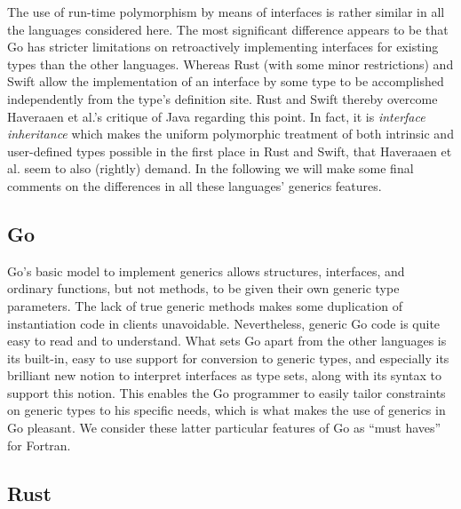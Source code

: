 \documentclass[11pt,oneside]{report}
\begin{document}
The use of run-time polymorphism by means of interfaces is rather
similar in all the languages considered here. The most significant
difference appears to be that Go has stricter limitations on
retroactively implementing interfaces for existing types than the
other languages. Whereas Rust (with some minor restrictions) and Swift
allow the implementation of an interface by some type to be
accomplished independently from the type's definition site. Rust and
Swift thereby overcome Haveraaen et al.'s critique
\cite{Haveraaen_et_al_19} of Java regarding this point. In fact, it is
\emph{interface inheritance} which makes the uniform polymorphic
treatment of both intrinsic and user-defined types possible in the
first place in Rust and Swift, that Haveraaen et al. seem to also
(rightly) demand. In the following we will make some final comments on
the differences in all these languages' generics features.

\subsection{Go}

Go's basic model to implement generics allows structures, interfaces,
and ordinary functions, but not methods, to be given their own generic
type parameters. The lack of true generic methods makes some
duplication of instantiation code in clients
unavoidable. Nevertheless, generic Go code is quite easy to read and
to understand. What sets Go apart from the other languages is its
built-in, easy to use support for conversion to generic types, and
especially its brilliant new notion to interpret interfaces as type
sets, along with its syntax to support this notion. This enables the
Go programmer to easily tailor constraints on generic types to his
specific needs, which is what makes the use of generics in Go
pleasant. We consider these latter particular features of Go as ``must
haves'' for Fortran.

\subsection{Rust}
\end{document}
